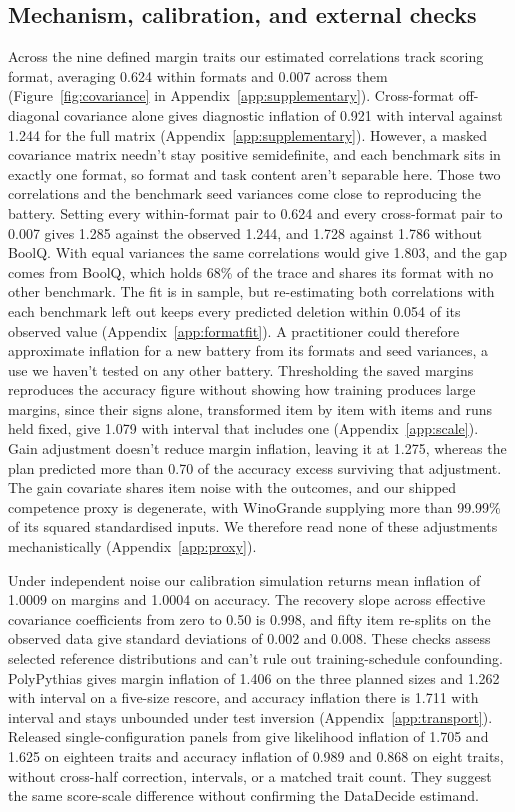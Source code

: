 \subsection{Mechanism, calibration, and external checks}
Across the nine defined margin traits our estimated correlations track scoring format, averaging 0.624 within formats and 0.007 across them (Figure~\ref{fig:covariance} in Appendix~\ref{app:supplementary}). Cross-format off-diagonal covariance alone gives diagnostic inflation of 0.921 with interval  against 1.244 for the full matrix (Appendix~\ref{app:supplementary}). However, a masked covariance matrix needn't stay positive semidefinite, and each benchmark sits in exactly one format, so format and task content aren't separable here. Those two correlations and the benchmark seed variances come close to reproducing the battery. Setting every within-format pair to 0.624 and every cross-format pair to 0.007 gives 1.285 against the observed 1.244, and 1.728 against 1.786 without BoolQ. With equal variances the same correlations would give 1.803, and the gap comes from BoolQ, which holds 68\% of the trace and shares its format with no other benchmark. The fit is in sample, but re-estimating both correlations with each benchmark left out keeps every predicted deletion within 0.054 of its observed value (Appendix~\ref{app:formatfit}). A practitioner could therefore approximate inflation for a new battery from its formats and seed variances, a use we haven't tested on any other battery. Thresholding the saved margins reproduces the accuracy figure without showing how training produces large margins, since their signs alone, transformed item by item with items and runs held fixed, give 1.079 with interval  that includes one (Appendix~\ref{app:scale}). Gain adjustment doesn't reduce margin inflation, leaving it at 1.275, whereas the plan predicted more than 0.70 of the accuracy excess surviving that adjustment. The gain covariate shares item noise with the outcomes, and our shipped competence proxy is degenerate, with WinoGrande supplying more than 99.99\% of its squared standardised inputs. We therefore read none of these adjustments mechanistically (Appendix~\ref{app:proxy}).

Under independent noise our calibration simulation returns mean inflation of 1.0009 on margins and 1.0004 on accuracy. The recovery slope across effective covariance coefficients from zero to 0.50 is 0.998, and fifty item re-splits on the observed data give standard deviations of 0.002 and 0.008. These checks assess selected reference distributions and can't rule out training-schedule confounding. PolyPythias gives margin inflation of 1.406 on the three planned sizes and 1.262 with interval  on a five-size rescore, and accuracy inflation there is 1.711 with interval  and stays unbounded under test inversion (Appendix~\ref{app:transport}). Released single-configuration panels from \citet{heineman2025} give likelihood inflation of 1.705 and 1.625 on eighteen traits and accuracy inflation of 0.989 and 0.868 on eight traits, without cross-half correction, intervals, or a matched trait count. They suggest the same score-scale difference without confirming the DataDecide estimand.

